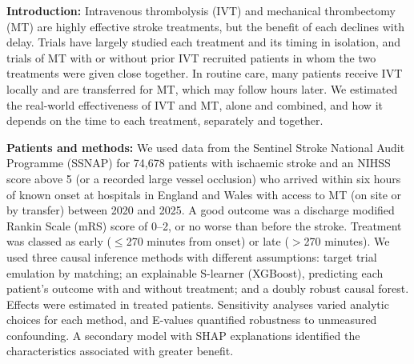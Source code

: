 \else

\textbf{Introduction:} Intravenous thrombolysis (IVT) and mechanical thrombectomy (MT) are highly effective stroke treatments, but the benefit of each declines with delay. Trials have largely studied each treatment and its timing in isolation, and trials of MT with or without prior IVT recruited patients in whom the two treatments were given close together. In routine care, many patients receive IVT locally and are transferred for MT, which may follow hours later. We estimated the real-world effectiveness of IVT and MT, alone and combined, and how it depends on the time to each treatment, separately and together.

\textbf{Patients and methods:} We used data from the Sentinel Stroke National Audit Programme (SSNAP) for 74,678 patients with ischaemic stroke and an NIHSS score above 5 (or a recorded large vessel occlusion) who arrived within six hours of known onset at hospitals in England and Wales with access to MT (on site or by transfer) between 2020 and 2025. A good outcome was a discharge modified Rankin Scale (mRS) score of 0--2, or no worse than before the stroke. Treatment was classed as early ($\leq$270 minutes from onset) or late ($>$270 minutes). We used three causal inference methods with different assumptions: target trial emulation by matching; an explainable S-learner (XGBoost), predicting each patient's outcome with and without treatment; and a doubly robust causal forest. Effects were estimated in treated patients. Sensitivity analyses varied analytic choices for each method, and E-values quantified robustness to unmeasured confounding. A secondary model with SHAP explanations identified the characteristics associated with greater benefit.

